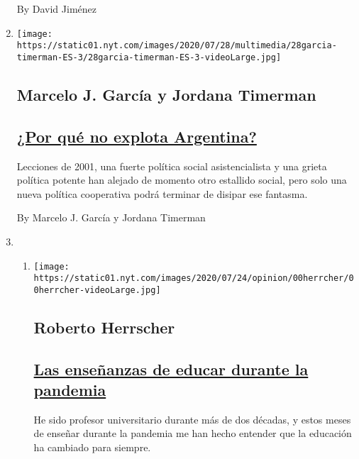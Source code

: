 \begin{enumerate}
  By David Jiménez
\item
  \texttt{[image: https://static01.nyt.com/images/2020/07/28/multimedia/28garcia-timerman-ES-3/28garcia-timerman-ES-3-videoLarge.jpg]}

  \hypertarget{marcelo-j-garcuxeda-y-jordana-timerman}{%
  \subsection{Marcelo J. García y Jordana
  Timerman}\label{marcelo-j-garcuxeda-y-jordana-timerman}}

  \hypertarget{por-quuxe9-no-explota-argentina}{%
  \subsection{\texorpdfstring{\href{/es/2020/07/28/espanol/opinion/argentina-estallido-2001-coronavirus.html}{¿Por
  qué no explota
  Argentina?}}{¿Por qué no explota Argentina?}}\label{por-quuxe9-no-explota-argentina}}

  Lecciones de 2001, una fuerte política social asistencialista y una
  grieta política potente han alejado de momento otro estallido social,
  pero solo una nueva política cooperativa podrá terminar de disipar ese
  fantasma.

  By Marcelo J. García y Jordana Timerman
\item
  \begin{enumerate}
  \def\labelenumii{\arabic{enumii}.}
  \item
    \texttt{[image: https://static01.nyt.com/images/2020/07/24/opinion/00herrcher/00herrcher-videoLarge.jpg]}

    \hypertarget{roberto-herrscher}{%
    \subsection{Roberto Herrscher}\label{roberto-herrscher}}

    \hypertarget{las-enseuxf1anzas-de-educar-durante-la-pandemia}{%
    \subsection{\texorpdfstring{\href{/es/2020/07/27/espanol/opinion/clases-universidad-coronavirus.html}{Las
    enseñanzas de educar durante la
    pandemia}}{Las enseñanzas de educar durante la pandemia}}\label{las-enseuxf1anzas-de-educar-durante-la-pandemia}}

    He sido profesor universitario durante más de dos décadas, y estos
    meses de enseñar durante la pandemia me han hecho entender que la
    educación ha cambiado para siempre.


\end{enumerate}
\end{enumerate}

